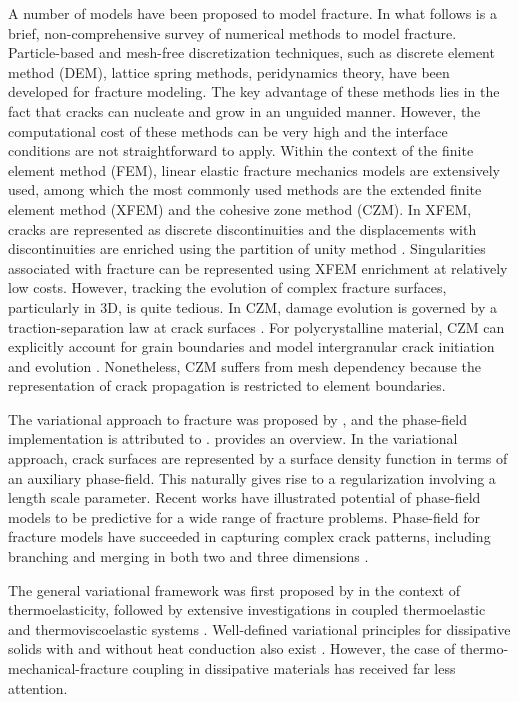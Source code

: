 A number of models have been proposed to model fracture. In what follows is a brief, non-comprehensive survey of numerical methods to model fracture. Particle-based and mesh-free discretization techniques, such as discrete element method (DEM), lattice spring methods, peridynamics theory, have been developed for fracture modeling. The key advantage of these methods lies in the fact that cracks can nucleate and grow in an unguided manner. However, the computational cost of these methods can be very high and the interface conditions are not straightforward to apply. Within the context of the finite element method (FEM), linear elastic fracture mechanics models are extensively used, among which the most commonly used methods are the extended finite element method (XFEM) and the cohesive zone method (CZM). In XFEM, cracks are represented as discrete discontinuities and the displacements with discontinuities are enriched using the partition of unity method \cite{babuaka1997, Dolbow99}. Singularities associated with fracture can be represented using XFEM enrichment at relatively low costs. However, tracking the evolution of complex fracture surfaces, particularly in 3D, is quite tedious. In CZM, damage evolution is governed by a traction-separation law at crack surfaces \cite{needleman_1992, ortiz_1999}. For polycrystalline material, CZM can explicitly account for grain boundaries and model intergranular crack initiation and evolution \cite{KAMAYA2007, KAMAYA2009}. Nonetheless, CZM suffers from mesh dependency because the representation of crack propagation is restricted to element boundaries.

The variational approach to fracture was proposed by \citet{Francfort98}, and the phase-field implementation is attributed to \citet{Bourdin2000}.
\citet{bourdin2008variational} provides an overview.  In the variational approach, crack surfaces are represented by a surface density function in terms of an auxiliary phase-field. This naturally gives rise to a regularization involving a length scale parameter. Recent works have illustrated potential of phase-field models to be predictive for a wide range of fracture problems. Phase-field for fracture models have succeeded in capturing complex crack patterns, including branching and merging in both two and three dimensions \cite{karma_2001, karma_2004, henry_2004, spatschek_2007, amor_2009}.

The general variational framework was first proposed by \citet{biot1956thermoelasticity} in the context of thermoelasticity, followed by extensive investigations in coupled thermoelastic and thermoviscoelastic systems \cite{herrmann1963variational,ben1965variational,oden2012variational,molinari1987global,batra1989principle,matsubara2021variationally}. Well-defined variational principles for dissipative solids with and without heat conduction also exist \cite{ortiz_1999,yang2006variational}. However, the case of thermo-mechanical-fracture coupling in dissipative materials has received far less attention.

